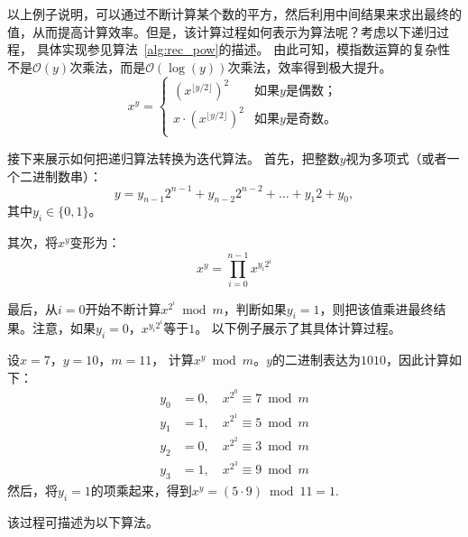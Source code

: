 以上例子说明，可以通过不断计算某个数的平方，然后利用中间结果来求出最终的值，从而提高计算效率。但是，该计算过程如何表示为算法呢？考虑以下递归过程，
具体实现参见算法~\ref{alg:rec_pow}的描述。
由此可知，模指数运算的复杂性不是$\mathcal{O}(y)$次乘法，而是$\mathcal{O}(\log (y))$次乘法，效率得到极大提升。
\begin{equation}  
\label{eq:rec_pow}
x ^ y = 
\left\{  
\begin{array}{lr}  
(x ^{ \lfloor y/2 \rfloor })^2 &  \text{如果$y$是偶数；}\\  

x \cdot (x ^{ \lfloor y/2 \rfloor })^2 & \text{如果$y$是奇数。} \\  

\end{array}  
\right.  
\end{equation}

\begin{center}
\label{alg:rec_pow}
	
\end{center}

接下来展示如何把递归算法转换为迭代算法。
首先，把整数$y$视为多项式（或者一个二进制数串）：
\[ y = y_{n-1}2^{n-1} + y_{n-2}2^{n-2} + \ldots + y_1 2 + y_0 ,\] 
其中$y_i \in \{0, 1\}$。

其次，将$x^y$变形为：
\[x^y = \prod_{i=0}^{n-1}  x^{y_i2^{i}}\]

最后，从$i=0$开始不断计算$x^{2^{i}} \bmod m$，判断如果$y_i = 1$，则把该值乘进最终结果。注意，如果$y_i = 0$，$x^{y_i2^{i}}$等于$1$。
以下例子展示了其具体计算过程。

\begin{example}
	设$x=7$，$y= 10$，$m = 11$，
	计算$x^y \bmod m$。$y$的二进制表达为$1010$，因此计算如下：
	\begin{align*}
		y_0 &= 0, \quad x^{2^0} \equiv 7 \bmod m\\
		y_1 &= 1, \quad x^{2^1} \equiv 5 \bmod m\\
		y_2 &= 0, \quad x^{2^2} \equiv 3 \bmod m\\
        y_3 &= 1, \quad x^{2^3} \equiv 9 \bmod m
	\end{align*}
然后，将$y_i = 1$的项乘起来，得到$x^y = (5 \cdot 9) \bmod 11 = 1$.
\end{example}

该过程可描述为以下算法。
\begin{center}
\label{alg:ite_pow}
	
\end{center}

